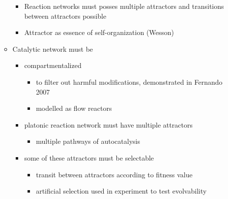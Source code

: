 \begin{itemize}
\begin{itemize}
\begin{itemize}
					\item
					
					Reaction networks must posses multiple attractors and transitions
					between attractors possible
					
					\item
					
					Attractor as essence of self-organization (Wesson)
					
				\end{itemize}
				\item
				
				Catalytic network must be
				
				
				\begin{itemize}
					\item
					
					compartmentalized
					
					
					\begin{itemize}
						\item
						
						to filter out harmful modifications, demonstrated in Fernando
						2007
						
						\item
						
						modelled as flow reactors
						
					\end{itemize}
					\item
					
					platonic reaction network must have multiple attractors
					
					
					\begin{itemize}
						\item
						
						multiple pathways of autocatalysis
						
					\end{itemize}
					\item
					
					some of these attractors must be selectable
					
					
					\begin{itemize}
						\item
						
						transit between attractors according to fitness value
						
						\item
						
						artificial selection used in experiment to test evolvability
						

\end{itemize}
\end{itemize}
\end{itemize}
\end{itemize}
